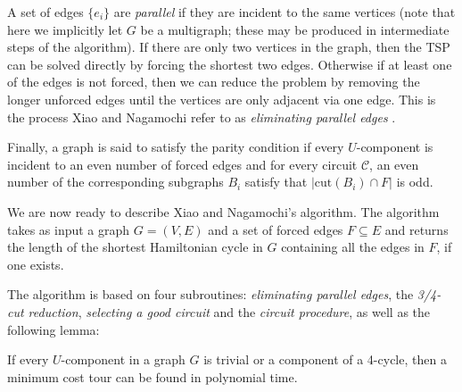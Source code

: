 A set of edges $\{e_i\}$ are {\em parallel} if they are incident to the same vertices (note that here we implicitly let $G$ be a multigraph; these may be produced in intermediate steps of the algorithm). If there are only two vertices in the graph, then the TSP can be solved directly by forcing the shortest two edges. Otherwise if at least one of the edges is not forced, then we can reduce the problem by removing the longer unforced edges until the vertices are only adjacent via one edge. This is the process Xiao and Nagamochi refer to as {\em eliminating parallel edges} \cite{xiao2016degree3}.

Finally, a graph is said to satisfy the parity condition if every $U$-component is incident to an even number of forced edges and for every circuit $\mathcal{C}$, an even number of the corresponding subgraphs $B_i$ satisfy that $|\text{cut}(B_i) \cap F|$ is odd.




We are now ready to describe Xiao and Nagamochi's algorithm. The algorithm takes as input a graph $G = (V, E)$ and a set of forced edges $F \subseteq E$ and returns the length of the shortest Hamiltonian cycle in $G$ containing all the edges in $F$, if one exists.

The algorithm is based on four subroutines: {\em eliminating parallel edges}, the {\em 3/4-cut reduction}, {\em selecting a good circuit} and the {\em circuit procedure}, as well as the following lemma:

\begin{lemma}
\label{lem:trivial}
If every $U$-component in a graph $G$ is trivial or a component of a 4-cycle, then a minimum cost tour can be found in polynomial time.
\end{lemma}

